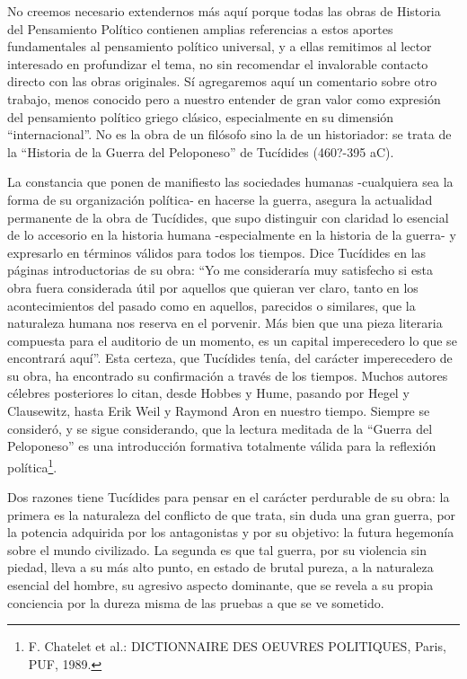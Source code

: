 \documentclass[
]{book}
\begin{document}
No creemos necesario extendernos más aquí porque todas las obras de Historia del Pensamiento Político contienen amplias referencias a estos aportes fundamentales al pensamiento político universal, y a ellas remitimos al lector interesado en profundizar el tema, no sin recomendar el invalorable contacto directo con las obras originales. Sí agregaremos aquí un comentario sobre otro trabajo, menos conocido pero a nuestro entender de gran valor como expresión del pensamiento político griego clásico, especialmente en su dimensión ``internacional''. No es la obra de un filósofo sino la de un historiador: se trata de la ``Historia de la Guerra del Peloponeso'' de Tucídides (460?-395 aC).

La constancia que ponen de manifiesto las sociedades humanas -cualquiera sea la forma de su organización política- en hacerse la guerra, asegura la actualidad permanente de la obra de Tucídides, que supo distinguir con claridad lo esencial de lo accesorio en la historia humana -especialmente en la historia de la guerra- y expresarlo en términos válidos para todos los tiempos. Dice Tucídides en las páginas introductorias de su obra: ``Yo me consideraría muy satisfecho si esta obra fuera considerada útil por aquellos que quieran ver claro, tanto en los acontecimientos del pasado como en aquellos, parecidos o similares, que la naturaleza humana nos reserva en el porvenir. Más bien que una pieza literaria compuesta para el auditorio de un momento, es un capital imperecedero lo que se encontrará aquí''. Esta certeza, que Tucídides tenía, del carácter imperecedero de su obra, ha encontrado su confirmación a través de los tiempos. Muchos autores célebres posteriores lo citan, desde Hobbes y Hume, pasando por Hegel y Clausewitz, hasta Erik Weil y Raymond Aron en nuestro tiempo. Siempre se consideró, y se sigue considerando, que la lectura meditada de la ``Guerra del Peloponeso'' es una introducción formativa totalmente válida para la reflexión política\footnote{F. Chatelet et al.: DICTIONNAIRE DES OEUVRES POLITIQUES, Paris, PUF, 1989.}.

Dos razones tiene Tucídides para pensar en el carácter perdurable de su obra: la primera es la naturaleza del conflicto de que trata, sin duda una gran guerra, por la potencia adquirida por los antagonistas y por su objetivo: la futura hegemonía sobre el mundo civilizado. La segunda es que tal guerra, por su violencia sin piedad, lleva a su más alto punto, en estado de brutal pureza, a la naturaleza esencial del hombre, su agresivo aspecto dominante, que se revela a su propia conciencia por la dureza misma de las pruebas a que se ve sometido.
\end{document}
